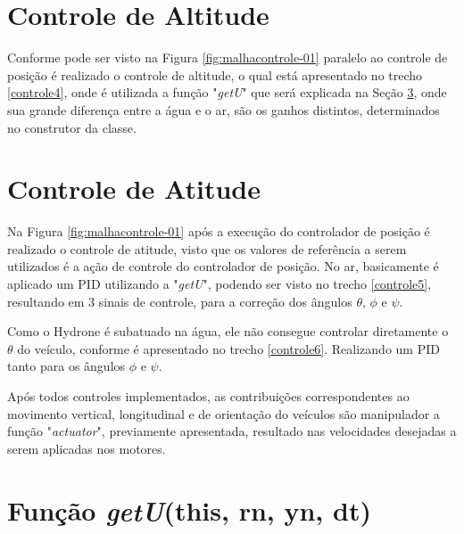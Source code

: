 \section{Controle de Altitude}

Conforme pode ser visto na Figura \ref{fig:malhacontrole-01} paralelo ao controle de posição é realizado o controle de altitude, o qual está apresentado no trecho \ref{controle4}, onde é utilizada a função "\textit{getU}" que será explicada na Seção \ref{pid}, onde sua grande diferença entre a água e o ar, são os ganhos distintos, determinados no construtor da classe.




\section{Controle de Atitude}

Na Figura \ref{fig:malhacontrole-01} após a execução do controlador de posição é realizado o controle de atitude, visto que os valores de referência a serem utilizados é a ação de controle do controlador de posição. No ar, basicamente é aplicado um PID utilizando a "\textit{getU}", podendo ser visto no trecho \ref{controle5}, resultando em 3 sinais de controle, para a correção dos ângulos $\theta$, $\phi$ e $\psi$.



Como o Hydrone é subatuado na água, ele não consegue controlar diretamente o $\theta$ do veículo,  conforme é apresentado no trecho \ref{controle6}. Realizando um PID tanto para os ângulos $\phi$ e $\psi$.



Após todos controles implementados, as contribuições correspondentes ao movimento vertical, longitudinal e de orientação do veículos são manipulador a função "\textit{actuator}", previamente apresentada, resultado nas velocidades desejadas a serem aplicadas nos motores.

\section{Função \textit{getU}(this, rn, yn, dt)}\label{pid}

